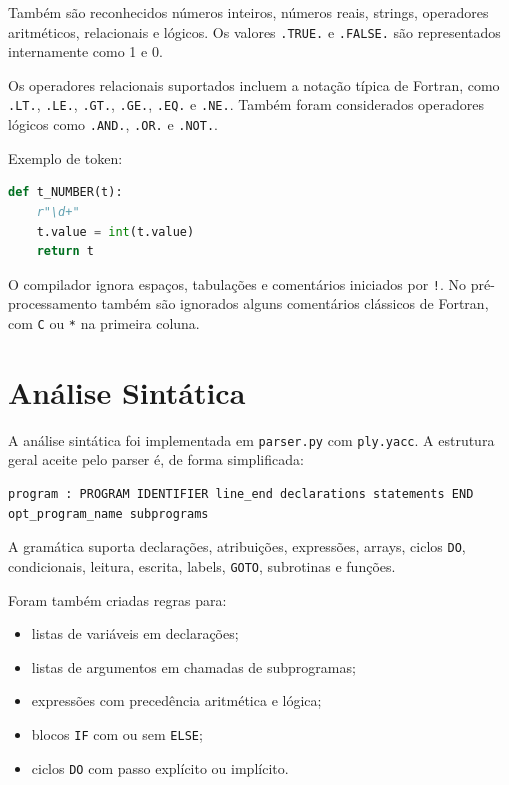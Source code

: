 \documentclass[11pt,a4paper]{article}
\begin{document}
Também são reconhecidos números inteiros, números reais, strings, operadores aritméticos, relacionais e lógicos. Os valores \texttt{.TRUE.} e \texttt{.FALSE.} são representados internamente como 1 e 0.

Os operadores relacionais suportados incluem a notação típica de Fortran, como \texttt{.LT.}, \texttt{.LE.}, \texttt{.GT.}, \texttt{.GE.}, \texttt{.EQ.} e \texttt{.NE.}. Também foram considerados operadores lógicos como \texttt{.AND.}, \texttt{.OR.} e \texttt{.NOT.}.

Exemplo de token:

\begin{lstlisting}[language=Python]
def t_NUMBER(t):
    r"\d+"
    t.value = int(t.value)
    return t
\end{lstlisting}

O compilador ignora espaços, tabulações e comentários iniciados por \texttt{!}. No pré-processamento também são ignorados alguns comentários clássicos de Fortran, com \texttt{C} ou \texttt{*} na primeira coluna.

\section{Análise Sintática}

A análise sintática foi implementada em \texttt{parser.py} com \texttt{ply.yacc}. A estrutura geral aceite pelo parser é, de forma simplificada:

\begin{lstlisting}
program : PROGRAM IDENTIFIER line_end declarations statements END opt_program_name subprograms
\end{lstlisting}

A gramática suporta declarações, atribuições, expressões, arrays, ciclos \texttt{DO}, condicionais, leitura, escrita, labels, \texttt{GOTO}, subrotinas e funções.

Foram também criadas regras para:

\begin{itemize}
    \item listas de variáveis em declarações;
    \item listas de argumentos em chamadas de subprogramas;
    \item expressões com precedência aritmética e lógica;
    \item blocos \texttt{IF} com ou sem \texttt{ELSE};
    \item ciclos \texttt{DO} com passo explícito ou implícito.
\end{itemize}
\end{document}
